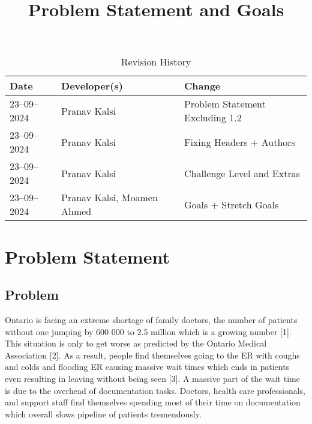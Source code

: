\documentclass{article}
\title{Problem Statement and Goals\\\progname}
\author{\authname}
\date{}
\begin{document}
\maketitle

\begin{table}[hp]
\caption{Revision History} \label{TblRevisionHistory}
\begin{tabularx}{\textwidth}{llX}
\toprule
\textbf{Date} & \textbf{Developer(s)} & \textbf{Change}\\
\midrule
23--09--2024 & Pranav Kalsi & Problem Statement Excluding 1.2\\
23--09--2024 & Pranav Kalsi & Fixing Headers + Authors\\
23--09--2024 & Pranav Kalsi & Challenge Level and Extras\\
23--09--2024 & Pranav Kalsi, Moamen Ahmed& Goals + Stretch Goals\\
\bottomrule
\end{tabularx}
\end{table}

\section{Problem Statement}



\subsection{Problem}

Ontario is facing an extreme shortage of family doctors, the number of patients without one jumping by 600 000 to 2.5 million which is a growing number [1]. This situation is only to get worse as predicted by the Ontario Medical Association [2]. As a result, people find themselves going to the ER with coughs and colds and flooding ER causing massive wait times which ends in patients even resulting in leaving without being seen [3]. A massive part of the wait time is due to the overhead of documentation tasks. Doctors, health care professionals, and support staff find themselves spending most of their time on documentation which overall slows pipeline of patients tremendously.
\end{document}
